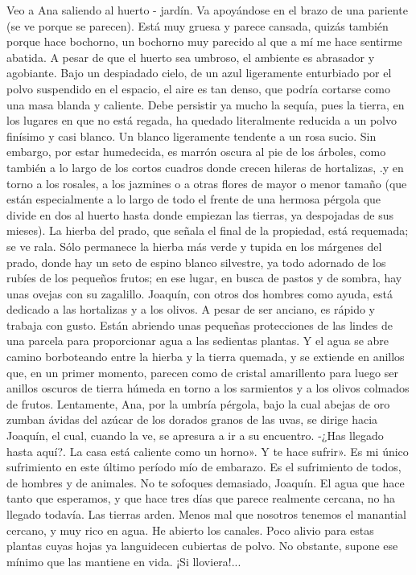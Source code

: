 \documentclass[12pt]{book} %
\begin{document}
Veo a Ana saliendo al huerto - jardín. Va apoyándose en el brazo de una pariente (se ve porque se parecen). Está muy gruesa y parece cansada, quizás también porque hace bochorno, un bochorno muy parecido al que a mí me hace sentirme abatida. 
A pesar de que el huerto sea umbroso, el ambiente es abrasador y agobiante. Bajo un despiadado cielo, de un azul 
ligeramente enturbiado por el polvo suspendido en el espacio, el aire es tan denso, que podría cortarse como una masa blanda y caliente. Debe persistir ya mucho la sequía, pues la tierra, en los lugares en que no está regada, ha quedado literalmente reducida a un polvo finísimo y casi blanco. Un blanco ligeramente tendente a un rosa sucio. Sin embargo, por estar humedecida, es marrón oscura al pie de los árboles, como también a lo largo de los cortos cuadros donde crecen hileras de hortalizas, .y en torno a los rosales, a los jazmines o a otras flores de mayor o menor tamaño (que están especialmente a lo largo de todo el frente de una hermosa pérgola que divide en dos al huerto hasta donde empiezan las tierras, ya despojadas de sus mieses). La hierba del prado, que señala el final de la propiedad, está requemada; se ve rala. Sólo permanece la hierba más verde y tupida en los márgenes del prado, donde hay un seto de espino blanco silvestre, ya todo adornado de los rubíes de los pequeños frutos; en ese lugar, en busca de pastos y de sombra, hay unas ovejas con su zagalillo. 
Joaquín, con otros dos hombres como ayuda, está dedicado a las hortalizas y a los olivos. A pesar de ser anciano, es 
rápido y trabaja con gusto. Están abriendo unas pequeñas protecciones de las lindes de una parcela para proporcionar agua a las sedientas plantas. Y el agua se abre camino borboteando entre la hierba y la tierra quemada, y se extiende en anillos que, en un primer momento, parecen como de cristal amarillento para luego ser anillos oscuros de tierra húmeda en torno a los sarmientos y a los olivos colmados de frutos. 
Lentamente, Ana, por la umbría pérgola, bajo la cual abejas de oro zumban ávidas del azúcar de los dorados granos de 
las uvas, se dirige hacia Joaquín, el cual, cuando la ve, se apresura a ir a su encuentro. 
-¿Has llegado hasta aquí?. 
La casa está caliente como un horno». 
Y te hace sufrir». 
Es mi único sufrimiento en este último período mío de embarazo. Es el sufrimiento de todos, de hombres y de animales. No te sofoques demasiado, Joaquín. 
El agua que hace tanto que esperamos, y que hace tres días que parece realmente cercana, no ha llegado todavía. Las tierras arden. Menos mal que nosotros tenemos el manantial cercano, y muy rico en agua. He abierto los canales. Poco alivio para estas plantas cuyas hojas ya languidecen cubiertas de polvo. No obstante, supone ese mínimo que las mantiene en vida. ¡Si lloviera!... 
\end{document}
